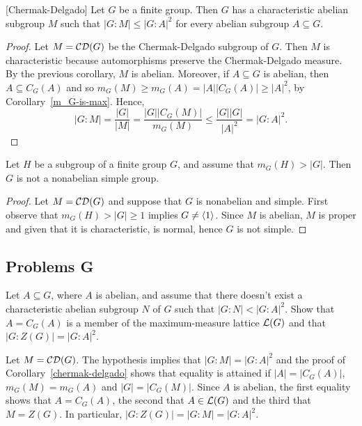 \begin{cor}\label{chermak-delgado} {\rm[Chermak-Delgado]}
    Let\/ $G$ be a finite group. Then\/ $G$ has a characteristic abelian subgroup\/ $M$ such that\/ $|G:M| \le |G:A|^2$ for every abelian subgroup $A\subseteq G$.
\end{cor}

\begin{proof} Let $M=\operatorname{{\cal CD}}(G)$ be the Chermak-Delgado subgroup of $G$. Then $M$ is characteristic because automorphisms preserve the Chermak-Delgado measure. By the previous corollary, $M$ is abelian. Moreover, if $A\subseteq G$ is abelian, then $A\subseteq C_G(A)$ and so $m_G(M)\ge m_G(A)=|A||C_G(A)|\ge |A|^2$, by Corollary~\ref{m_G-is-max}. Hence,
$$
    |G:M| = \frac{|G|}{|M|}=\frac{|G||C_G(M)|}{m_G(M)}
        \le\frac{|G||G|}{|A|^2} = |G:A|^2.
$$
 \end{proof}

\begin{cor}\label{not-nonabelian-simple}
    Let\/ $H$ be a subgroup of a finite group\/ $G$, and assume that\/ $m_G(H)>|G|$. Then\/ $G$ is not a nonabelian simple group.
\end{cor}

\begin{proof} Let $M=\operatorname{{\cal CD}}(G)$ and suppose that $G$ is nonabelian and simple. First observe that $m_G(H)>|G|\ge1$ implies $G\ne\langle1\rangle$. Since $M$ is abelian, $M$ is proper and given that it is characteristic, is normal, hence $G$ is not simple.  \end{proof}

\subsection{Problems G}

\begin{probl}\label{problem-1.G.1}
    Let\/ $A\subseteq G$, where\/ $A$ is abelian, and assume that there doesn't exist a characteristic abelian subgroup\/ $N$ of\/ $G$ such that\/ $|G:N| < |G:A|^2$. Show that\/ $A=C_G(A)$ is a member of the maximum-measure lattice ${\cal L}(G)$ and that\/ $|G:Z(G)| = |G:A|^2$.
\end{probl}

\begin{solution} Let $M=\operatorname{{\cal CD}}(G)$. The hypothesis implies that $|G:M|=|G:A|^2$ and the proof of Corollary~\ref{chermak-delgado} shows that equality is attained if $|A|=|C_G(A)|$, $m_G(M)=m_G(A)$ and $|G|=|C_G(M)|$. Since $A$ is abelian, the first equality shows that $A=C_G(A)$, the second that $A\in{\cal L}(G)$ and the third that $M=Z(G)$. In particular, $|G:Z(G)|=|G:M|=|G:A|^2$.  \end{solution}

